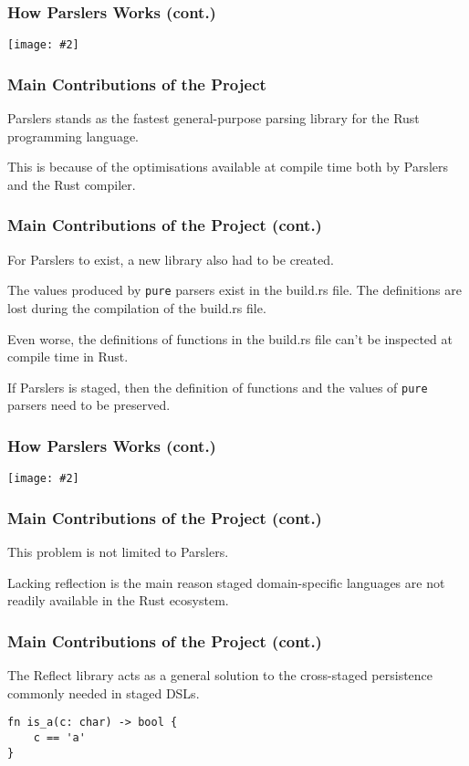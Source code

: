 \documentclass{slides}
\newcommand{\centerimg}[2]{
    \begin{center}
        \texttt{[image: \#2]}
    \end{center}
}
\begin{document}
\begin{frame}
\frametitle{How Parslers Works (cont.)}

\centerimg{width=\textwidth}{compilation-stages.drawio.png}

\end{frame}

\begin{frame}
\frametitle{Main Contributions of the Project}

Parslers stands as the fastest general-purpose parsing library for the Rust programming language.

This is because of the optimisations available at compile time both by Parslers and the Rust compiler.

\end{frame}

\begin{frame}
\frametitle{Main Contributions of the Project (cont.)}

For Parslers to exist, a new library also had to be created.

The values produced by \texttt{pure} parsers exist in the build.rs file.
The definitions are lost during the compilation of the build.rs file.

Even worse, the definitions of functions in the build.rs file can't be inspected at compile time in Rust.

If Parslers is staged, then the definition of functions and the values of \texttt{pure} parsers need to be preserved.

\end{frame}

\begin{frame}
\frametitle{How Parslers Works (cont.)}

\centerimg{width=\textwidth}{compilation-stages.drawio.png}

\end{frame}

\begin{frame}
\frametitle{Main Contributions of the Project (cont.)}

This problem is not limited to Parslers.

Lacking reflection is the main reason staged domain-specific languages are not readily available in the Rust ecosystem.

\end{frame}

\begin{frame}[fragile]
\frametitle{Main Contributions of the Project (cont.)}

The Reflect library acts as a general solution to the cross-staged persistence commonly needed in staged DSLs.

\begin{verbatim}
fn is_a(c: char) -> bool {
    c == 'a'
}
\end{verbatim}

\end{frame}
\end{document}
